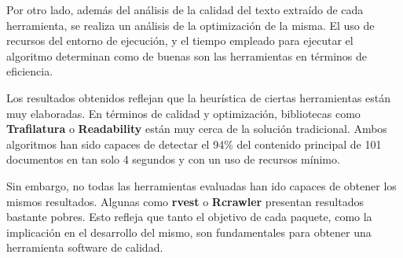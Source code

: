 Por otro lado, además del análisis de la calidad del texto extraído de cada herramienta, se realiza un
análisis de la optimización de la misma. El uso de recursos del entorno de ejecución, y el tiempo empleado
para ejecutar el algoritmo determinan como de buenas son las herramientas en términos de eficiencia.

Los resultados obtenidos reflejan que la heurística de ciertas herramientas están muy elaboradas. En
términos de calidad y optimización, bibliotecas como \textbf{Trafilatura} o \textbf{Readability} están muy
cerca de la solución tradicional. Ambos algoritmos han sido capaces de detectar el 94\% del contenido
principal de 101 documentos en tan solo 4 segundos y con un uso de recursos mínimo.

Sin embargo, no todas las herramientas evaluadas han ido capaces de obtener los mismos resultados. Algunas
como \textbf{rvest} o \textbf{Rcrawler} presentan resultados bastante pobres. Esto refleja que tanto el
objetivo de cada paquete, como la implicación en el desarrollo del mismo, son fundamentales para obtener
una herramienta software de calidad.

